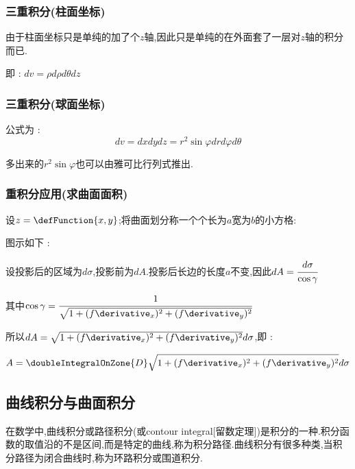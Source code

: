 {{  \subsubsection{三重积分(柱面坐标)}{
    由于柱面坐标只是单纯的加了个$z$轴,因此只是单纯的在外面套了一层对$z$轴的积分而已.

    即 : $dv = \rho d\rho d\theta dz$
  }%

  \subsubsection{三重积分(球面坐标)}{
    公式为 :
    $$
      dv = dxdydz = r^2\sin\varphi drd\varphi d\theta
    $$

    多出来的$r^2\sin\varphi$也可以由雅可比行列式推出.
  }%

  \subsubsection{重积分应用(求曲面面积)}{
    设$z = \defFunction{x,y}$;将曲面划分称一个个长为$a$宽为$b$的小方格:

    图示如下 :
    \begin{center}
    \end{center}

    设投影后的区域为$d\sigma$,投影前为$dA$.投影后长边的长度$a$不变,因此$dA = \cfrac{d\sigma}{\cos\gamma}$

    其中$\cos\gamma = \cfrac{1}{\sqrt{1 + (f\derivative_x)^2 + (f\derivative_y)^2}}$

    所以$dA = \sqrt{1 + (f\derivative_x)^2 + (f\derivative_y)^2}d\sigma$,即 :

    $$
      A = \doubleIntegralOnZone{D}\sqrt{1 + (f\derivative_x)^2 + (f\derivative_y)^2}d\sigma
    $$
  }%


}%

\subsection{曲线积分与曲面积分}{
  在数学中,曲线积分或路径积分(或contour integral[留数定理])是积分的一种.积分函数的取值沿的不是区间,而是特定的曲线,称为积分路径.曲线积分有很多种类,当积分路径为闭合曲线时,称为环路积分或围道积分.

}}
